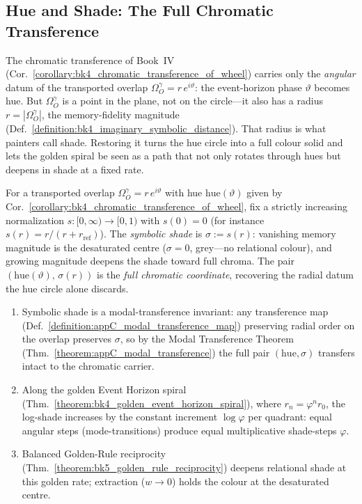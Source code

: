 \subsection{Hue and Shade: The Full Chromatic Transference}
\label{subsec:bk5_hue_and_shade}
The chromatic transference of Book~IV
(Cor.~\ref{corollary:bk4_chromatic_transference_of_wheel}) carries only the
\emph{angular} datum of the transported overlap $\Omega_O^\gamma=r\,e^{i\vartheta}$:
the event-horizon phase $\vartheta$ becomes hue. But $\Omega_O^\gamma$ is a point in
the plane, not on the circle---it also has a radius $r=|\Omega_O^\gamma|$, the
memory-fidelity magnitude
(Def.~\ref{definition:bk4_imaginary_symbolic_distance}). That radius is what painters
call shade. Restoring it turns the hue circle into a full colour solid and lets the
golden spiral be seen as a path that not only rotates through hues but deepens in
shade at a fixed rate.

\begin{definition}
\label{definition:bk5_symbolic_shade}
For a transported overlap $\Omega_O^\gamma=r\,e^{i\vartheta}$ with hue
$\mathrm{hue}(\vartheta)$ given by
Cor.~\ref{corollary:bk4_chromatic_transference_of_wheel}, fix a strictly increasing
normalization $s:[0,\infty)\to[0,1)$ with $s(0)=0$ (for instance
$s(r)=r/(r+r_{\mathrm{ref}})$). The \emph{symbolic shade} is $\sigma:=s(r)$:
vanishing memory magnitude is the desaturated centre ($\sigma=0$, grey---no
relational colour), and growing magnitude deepens the shade toward full chroma. The
pair $(\mathrm{hue}(\vartheta),\,\sigma(r))$ is the \emph{full chromatic coordinate},
recovering the radial datum the hue circle alone discards.
\end{definition}

\begin{proposition}
\label{proposition:bk5_shade_transfers}
\leavevmode
\begin{enumerate}
\item Symbolic shade is a modal-transference invariant: any transference map
(Def.~\ref{definition:appC_modal_transference_map}) preserving radial order on the
overlap preserves $\sigma$, so by the Modal Transference Theorem
(Thm.~\ref{theorem:appC_modal_transference}) the full pair
$(\mathrm{hue},\sigma)$ transfers intact to the chromatic carrier.
\item Along the golden Event Horizon spiral
(Thm.~\ref{theorem:bk4_golden_event_horizon_spiral}), where $r_n=\varphi^{n}r_0$, the
log-shade increases by the constant increment $\log\varphi$ per quadrant: equal
angular steps (mode-transitions) produce equal multiplicative shade-steps $\varphi$.
\item Balanced Golden-Rule reciprocity
(Thm.~\ref{theorem:bk5_golden_rule_reciprocity}) deepens relational shade at this
golden rate; extraction ($w\to 0$) holds the colour at the desaturated centre.
\end{enumerate}
\end{proposition}

